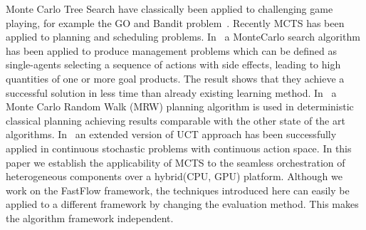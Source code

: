 \documentclass[smallextended]{svjour3}
\begin{document}
\noindent
Monte Carlo Tree Search have classically been applied to challenging game playing, for example the GO and Bandit 
problem~\cite{coulom2007efficient,kocsis2006bandit,chaslot2006monte,gelly2006exploration}.
Recently MCTS has been applied to planning and scheduling problems. In~\cite{chaslot2006montep} a MonteCarlo search algorithm has been applied 
to produce management problems which can be defined as single-agents selecting a sequence of actions with side effects, 
leading to high quantities of one or more goal products. The result shows that they achieve a successful solution in less time than 
already existing learning method. In~\cite{nakhost2009monte} a Monte Carlo Random Walk (MRW) planning algorithm is used in 
deterministic classical planning achieving results comparable with the other state of the art algorithms. 
In~\cite{couetoux2011continuous} an extended version of UCT approach has been successfully applied in continuous stochastic problems with continuous action space. 
In this paper we establish the applicability of MCTS to the seamless orchestration of heterogeneous components over a hybrid(CPU, GPU) platform.
Although we work on the FastFlow framework, the techniques introduced here can easily be applied to a different framework by changing the evaluation method.
This makes the algorithm framework independent. 
\end{document}
